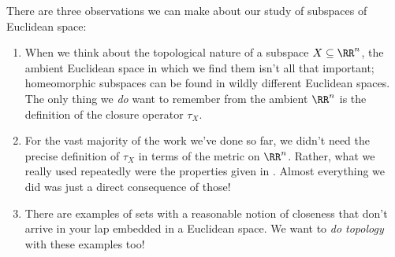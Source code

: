 
There are three observations we can make about our study of subspaces of Euclidean space:
\begin{enumerate}
	\item When we think about the topological nature of a subspace $X \subseteq \RR^n$, the ambient Euclidean space in which we find them isn't all that important;
		homeomorphic subspaces can be found in wildly different Euclidean spaces.
		The only thing we \emph{do} want to remember from the ambient $\RR^n$ is the definition of the closure operator $\tau_X$.
	\item For the vast majority of the work we've done so far, we didn't need the precise definition of $\tau_X$ in terms of the metric on $\RR^n$.
		Rather, what we really used repeatedly were the properties given in .
		Almost everything we did was just a direct consequence of those!
	\item There are examples of sets with a reasonable notion of closeness that don't arrive in your lap embedded in a Euclidean space.
		We want to \emph{do topology} with these examples too!
\end{enumerate}

